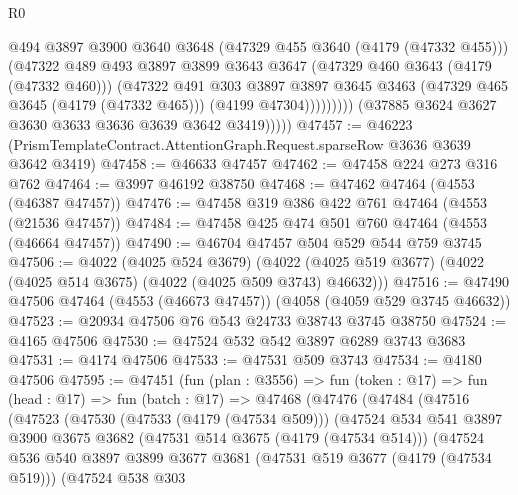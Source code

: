 \begin{lexlean}{R0}
\begin{coremodule}
                        @494
                        @3897
                        @3900
                        @3640
                        @3648
                        (@47329 @455 @3640 (@4179 (@47332 @455)))
                        (@47322
                          @489
                          @493
                          @3897
                          @3899
                          @3643
                          @3647
                          (@47329 @460 @3643 (@4179 (@47332 @460)))
                          (@47322
                            @491
                            @303
                            @3897
                            @3897
                            @3645
                            @3463
                            (@47329 @465 @3645 (@4179 (@47332 @465)))
                            (@4199 @47304)))))))))
            (@37885 @3624 @3627 @3630 @3633 @3636 @3639 @3642 @3419)))))
@47457 := @46223 (PrismTemplateContract.AttentionGraph.Request.sparseRow @3636 @3639 @3642 @3419)
@47458 := @46633 @47457
@47462 := @47458 @224 @273 @316 @762
@47464 := @3997 @46192 @38750
@47468 := @47462 @47464 (@4553 (@46387 @47457))
@47476 := @47458 @319 @386 @422 @761 @47464 (@4553 (@21536 @47457))
@47484 := @47458 @425 @474 @501 @760 @47464 (@4553 (@46664 @47457))
@47490 := @46704 @47457 @504 @529 @544 @759 @3745
@47506 := @4022
    (@4025 @524 @3679)
    (@4022 (@4025 @519 @3677) (@4022 (@4025 @514 @3675) (@4022 (@4025 @509 @3743) @46632)))
@47516 := @47490 @47506 @47464 (@4553 (@46673 @47457)) (@4058 (@4059 @529 @3745 @46632))
@47523 := @20934 @47506 @76 @543 @24733 @38743 @3745 @38750
@47524 := @4165 @47506
@47530 := @47524 @532 @542 @3897 @6289 @3743 @3683
@47531 := @4174 @47506
@47533 := @47531 @509 @3743
@47534 := @4180 @47506
@47595 := @47451
    (fun (plan : @3556) =>
    fun (token : @17) =>
    fun (head : @17) =>
    fun (batch : @17) =>
    @47468
      (@47476
        (@47484
          (@47516
            (@47523
              (@47530
                (@47533 (@4179 (@47534 @509)))
                (@47524
                  @534
                  @541
                  @3897
                  @3900
                  @3675
                  @3682
                  (@47531 @514 @3675 (@4179 (@47534 @514)))
                  (@47524
                    @536
                    @540
                    @3897
                    @3899
                    @3677
                    @3681
                    (@47531 @519 @3677 (@4179 (@47534 @519)))
                    (@47524
                      @538
                      @303

\end{coremodule}
\end{lexlean}

